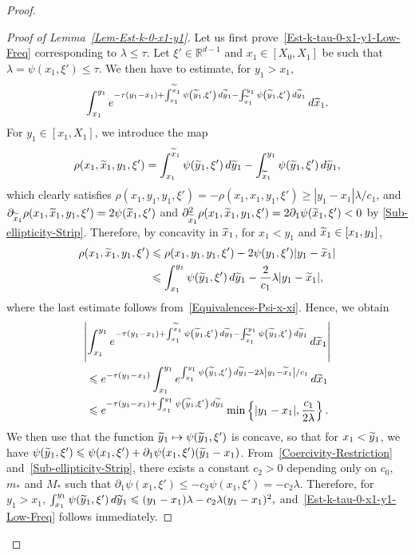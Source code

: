 \documentclass[AHL,Unicode,longabstracts]{cedram}
\newcommand*\R{\mathbb{R}}
\renewcommand{\leq}{\leqslant}
\renewcommand{\geq}{\geqslant}
\renewcommand{\tilde}{\widetilde}
\let\oldtilde\tilde
\renewcommand*{\tilde}[1]{\mathchoice{\widetilde{#1}}{\widetilde{#1}}{\oldtilde{#1}}{\oldtilde{#1}}}
\begin{document}
\begin{proof}
\begin{proof}[Proof of Lemma~\ref{Lem-Est-k-0-x1-y1}]
Let us first prove~\eqref{Est-k-tau-0-x1-y1-Low-Freq} corresponding to $\lambda \leq \tau$. Let $\xi' \in \R^{d-1}$ and $x_1 \in [X_0, X_1]$ be such that $\lambda = \psi(x_1,\xi') \leq \tau$. We then have to estimate, for $y_1 > x_1$,
\[
\int_{x_1}^{y_1} e^{-\tau (y_1-x_1)+\int_{x_1}^{ \tilde{x}_1} \psi\left(\tilde{y}_1,\xi'\right) \, d \tilde{y}_1- \int_{{\tilde{x}_1}}^{y_1} \psi\left(\tilde{y}_1,\xi'\right) \, d \tilde{y}_1} \, d \tilde{x}_1.
\]
For $ y_1 \in [x_1, X_1]$, we introduce the map
\[
\rho(x_1,\tilde x_1, y_1,\xi') =
\int_{x_1}^{\tilde{x}_1} \psi(\tilde{y}_1,\xi') \, d \tilde{y}_1 -
\int_{{\tilde{x}_1}}^{y_1} \psi(\tilde{y}_1,\xi') \,d \tilde{y}_1,
\]
which clearly satisfies $\rho(x_1,y_1, y_1, \xi') = - \rho(x_1,x_1,y_1, \xi') \geq |y_1 - x_1| \lambda /c_1$, and \\ $\partial_{\tilde x_1} \rho(x_1, \tilde x_1, y_1, \xi') = 2 \psi(\tilde x_1, \xi')$ and $\partial_{\tilde x_1}^2 \rho(x_1, \tilde x_1, y_1, \xi') = 2 \partial_1 \psi(\tilde x_1, \xi') <0$ by \eqref{Sub-ellipticity-Strip}. Therefore, by concavity in $\tilde x_1$, for $x_1 < y_1$ and $\tilde x_1 \in [x_1, y_1]$,
\begin{align*}
\rho(x_1, \tilde x_1, y_1, \xi')
&\leq \rho(x_1,y_1,y_1, \xi') - 2 \psi(y_1,\xi') |y_1 - \tilde x_1|\\
&\leq \int_{x_1}^{y_1} \psi(\tilde{y}_1,\xi') \, d \tilde{y}_1- \frac{2}{c_1} \lambda |y_1 - \tilde x_1|,
\end{align*}
where the last estimate follows from~\eqref{Equivalences-Psi-x-xi}. Hence, we obtain
\begin{multline*}
\left|
\int_{x_1}^{y_1} e^{-\tau (y_1-x_1)+\int_{x_1}^{ \tilde{x}_1} \psi\left(\tilde{y}_1,\xi'\right) \, d \tilde{y}_1- \int_{{\tilde{x}_1}}^{y_1} \psi\left(\tilde{y}_1,\xi'\right) \, d \tilde{y}_1} \, d \tilde{x}_1
\right|
\\
\begin{aligned}
&\leq e^{-\tau (y_1-x_1)} \int_{x_1}^{y_1} e^{\int_{x_1}^{y_1} \psi\left(\tilde{y}_1,\xi'\right) \, d \tilde{y}_1- {2} \lambda \left|y_1 - \tilde x_1\right|/{c_1}}
\, d \tilde{x}_1
\\
&\leq e^{-\tau(y_1 - x_1) + \int_{x_1}^{y_1} \psi\left(\tilde{y}_1,\xi'\right) \, d \tilde{y}_1} \min\left\{ |y_1 - x_1|, \frac{c_1}{2 \lambda}\right\}.
\end{aligned}
\end{multline*}
We then use that the function $\tilde y_1 \mapsto \psi(\tilde y_1, \xi') $ is concave, so that for $x_1 < \tilde y_1$, we have $\psi(\tilde y_1, \xi') \leq \psi(x_1, \xi') + \partial_1 \psi(x_1, \xi') (\tilde y_1 -x_1)$. From~\eqref{Coercivity-Restriction} and~\eqref{Sub-ellipticity-Strip}, there exists a constant $c_2>0$ depending only on $c_0$, $m_*$ and $M_*$ such that $\partial_1 \psi(x_1, \xi') \leq - c_2 \psi(x_1, \xi') = - c_2 \lambda$. Therefore, for $y_1 > x_1$, $
\int_{x_1}^{y_1} \psi(\tilde{y}_1,\xi') \, d \tilde{y}_1
\leq (y_1 -x_1) \lambda - c_2 \lambda (y_1 -x_1)^2, $ and~\eqref{Est-k-tau-0-x1-y1-Low-Freq} follows immediately.



\end{proof}
\end{proof}
\end{document}
